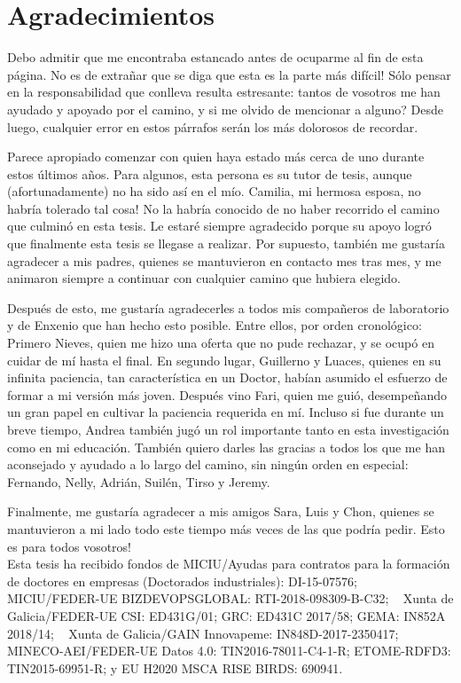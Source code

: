 \chapter*{Agradecimientos}
Debo admitir que me encontraba estancado antes de ocuparme al fin de esta p\'agina. \textexclamdown No es de extra\~nar que se diga que esta es la parte m\'as dif\'icil! S\'olo pensar en la responsabilidad que conlleva resulta estresante: tantos de vosotros me han ayudado y apoyado por el camino, \textquestiondown y si me olvido de mencionar a alguno? Desde luego, cualquier error en estos p\'arrafos ser\'an los m\'as dolorosos de recordar.

Parece apropiado comenzar con quien haya estado m\'as cerca de uno durante estos \'ultimos a\~nos. Para algunos, esta persona es su tutor de tesis, aunque (afortunadamente) no ha sido as\'i en el m\'io. \textexclamdown Camilia, mi hermosa esposa, no habr\'ia tolerado tal cosa! No la habr\'ia conocido de no haber recorrido el camino que culmin\'o en esta tesis. Le estaré siempre agradecido porque su apoyo logró que finalmente esta tesis se llegase a realizar. Por supuesto, tambi\'en me gustar\'ia agradecer a mis padres, quienes se mantuvieron en contacto mes tras mes, y me animaron siempre a continuar con cualquier camino que hubiera elegido.

Despu\'es de esto, me gustar\'ia agradecerles a todos mis compa\~neros de laboratorio y de Enxenio que han hecho esto posible. Entre ellos, por orden cronol\'ogico: Primero Nieves, quien me hizo una oferta que no pude rechazar, y se ocup\'o en cuidar de m\'i hasta el final. En segundo lugar, Guillerno y Luaces, quienes en su infinita paciencia, tan caracter\'istica en un Doctor, hab\'ian asumido el esfuerzo de formar a mi versi\'on m\'as joven. Despu\'es vino Fari, quien me gui\'o, desempe\~nando un gran papel en cultivar la paciencia requerida en m\'i. Incluso si fue durante un breve tiempo, Andrea tambi\'en jug\'o un rol importante tanto en esta investigaci\'on como en mi educaci\'on. Tambi\'en quiero darles las gracias a todos  los que me han aconsejado y ayudado a lo largo del camino, sin ning\'un orden en especial: Fernando, Nelly, Adri\'an, Suil\'en, Tirso y Jeremy.

Finalmente, me gustar\'ia agradecer a mis amigos Sara, Luis y Chon, quienes se mantuvieron a mi lado todo este tiempo m\'as veces de las que podr\'ia pedir. \textexclamdown Esto es para todos vosotros!\\

\small{Esta tesis ha recibido fondos de MICIU/Ayudas para contratos para la formaci\'on de doctores en empresas (Doctorados industriales): DI-15-07576; ~ MICIU/FEDER-UE BIZDEVOPSGLOBAL: RTI-2018-098309-B-C32; ~  Xunta de Galicia/FEDER-UE CSI: ED431G/01; GRC: ED431C 2017/58; GEMA: IN852A 2018/14; ~ Xunta de Galicia/GAIN Innovapeme: IN848D-2017-2350417; ~ MINECO-AEI/FEDER-UE Datos 4.0: TIN2016-78011-C4-1-R; ETOME-RDFD3: TIN2015-69951-R; y EU H2020 MSCA RISE BIRDS: 690941.}
